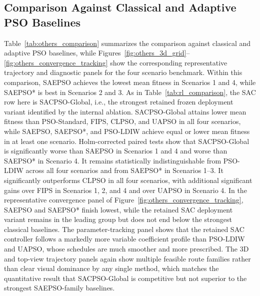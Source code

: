 \documentclass[final,5p,times]{elsarticle}
\begin{document}
\subsection{Comparison Against Classical and Adaptive PSO Baselines}
Table~\ref{tab:others_comparison} summarizes the comparison against classical and adaptive PSO baselines, while Figures~\ref{fig:others_3d_grid}--\ref{fig:others_convergence_tracking} show the corresponding representative trajectory and diagnostic panels for the four scenario benchmark.
Within this comparison, SAEPSO achieves the lowest mean fitness in Scenarios 1 and 4, while SAEPSO* is best in Scenarios 2 and 3.
As in Table~\ref{tab:rl_comparison}, the SAC row here is SACPSO-Global, i.e., the strongest retained frozen deployment variant identified by the internal ablation.
SACPSO-Global attains lower mean fitness than PSO-Standard, FIPS, CLPSO, and UAPSO in all four scenarios, while SAEPSO, SAEPSO*, and PSO-LDIW achieve equal or lower mean fitness in at least one scenario.
Holm-corrected paired tests show that SACPSO-Global is significantly worse than SAEPSO in Scenarios 1 and 4 and worse than SAEPSO* in Scenario 4.
It remains statistically indistinguishable from PSO-LDIW across all four scenarios and from SAEPSO* in Scenarios 1--3.
It significantly outperforms CLPSO in all four scenarios, with additional significant gains over FIPS in Scenarios 1, 2, and 4 and over UAPSO in Scenario 4.
In the representative convergence panel of Figure~\ref{fig:others_convergence_tracking}, SAEPSO and SAEPSO* finish lowest, while the retained SAC deployment variant remains in the leading group but does not end below the strongest classical baselines.
The parameter-tracking panel shows that the retained SAC controller follows a markedly more variable coefficient profile than PSO-LDIW and UAPSO, whose schedules are much smoother and more prescribed.
The 3D and top-view trajectory panels again show multiple feasible route families rather than clear visual dominance by any single method, which matches the quantitative result that SACPSO-Global is competitive but not superior to the strongest SAEPSO-family baselines.
\end{document}
